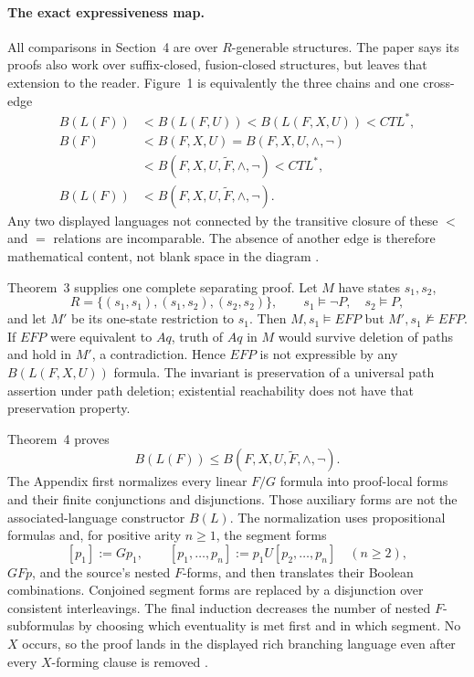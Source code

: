 \paragraph{The exact expressiveness map.}
All comparisons in Section~4 are over \(R\)-generable structures.  The
paper says its proofs also work over suffix-closed, fusion-closed structures,
but leaves that extension to the reader.  Figure~1 is equivalently the three
chains and one cross-edge
\[
\begin{aligned}
 B(L(F))
 &<B(L(F,U))
 <B(L(F,X,U))
 <CTL^*,\\
 B(F)
 &<B(F,X,U)
 =B(F,X,U,\land,\neg)\\
 &<B(F,X,U,\widetilde F,\land,\neg)
 <CTL^*,\\
 B(L(F))
 &<B(F,X,U,\widetilde F,\land,\neg).
\end{aligned}
\]
Any two displayed languages not connected by the transitive closure of
these \(<\) and \(=\) relations are incomparable.  The absence of another
edge is therefore mathematical content, not blank space in the diagram
\cite[pp.~160--163]{EmersonHalpern1986}.

Theorem~3 supplies one complete separating proof.  Let \(M\) have states
\(s_1,s_2\),
\[
 R=\{(s_1,s_1),(s_1,s_2),(s_2,s_2)\},
 \qquad s_1\models\neg P,\quad s_2\models P,
\]
and let \(M'\) be its one-state restriction to \(s_1\).
Then \(M,s_1\models EFP\) but \(M',s_1\not\models EFP\).
If \(EFP\) were equivalent to \(Aq\), truth of \(Aq\) in \(M\) would survive
deletion of paths and hold in \(M'\), a contradiction.  Hence \(EFP\) is
not expressible by any \(B(L(F,X,U))\) formula.  The invariant is preservation
of a universal path assertion under path deletion; existential reachability
does not have that preservation property.

Theorem~4 proves
\[
 B(L(F))\leq
 B(F,X,U,\widetilde F,\land,\neg).
\]
The Appendix first normalizes every linear \(F/G\) formula into proof-local
forms and their finite conjunctions and disjunctions.  Those auxiliary forms
are not the associated-language constructor \(B(L)\).  The normalization uses
propositional formulas and, for positive arity \(n\geq1\), the segment forms
\[
 [p_1]:=Gp_1,
 \qquad
 [p_1,\ldots,p_n]:=p_1U[p_2,\ldots,p_n]\quad(n\geq2),
\]
\(GFp\), and the source's nested \(F\)-forms, and then translates their Boolean
combinations.  Conjoined segment forms are replaced by a
disjunction over consistent interleavings.  The final induction decreases
the number of nested \(F\)-subformulas by choosing which eventuality is met
first and in which segment.  No \(X\) occurs, so the proof
lands in the displayed rich branching language even after every
\(X\)-forming clause is removed
\cite[Theorem~4, pp.~167--169]{EmersonHalpern1986}.

